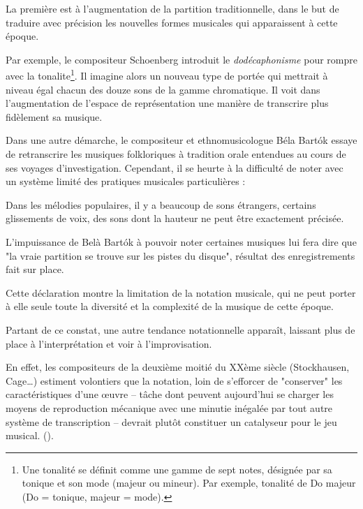 La première est à l'augmentation de la partition traditionnelle, dans le but de traduire avec précision les nouvelles formes musicales qui apparaissent à cette époque.

Par exemple, le compositeur Schoenberg introduit le \textit{dodécaphonisme} pour rompre avec la \gls{tonalite}\footnote{Une tonalité se définit comme une gamme de sept notes, désignée par sa tonique et son mode (majeur ou mineur). Par exemple, tonalité de Do majeur (Do = tonique, majeur = mode).}. Il imagine alors un nouveau type de portée qui mettrait à niveau égal chacun des douze sons de la gamme chromatique. Il voit dans l'augmentation de l'espace de représentation une manière de transcrire plus fidèlement sa musique.

Dans une autre démarche, le compositeur et ethnomusicologue Béla Bart\'{o}k essaye de retranscrire les musiques folkloriques à tradition orale entendues au cours de ses voyages d'investigation.
Cependant, il se heurte à la difficulté de noter avec un système limité des pratiques musicales particulières :

\begin{displayquote}
\og Dans les mélodies populaires, il y a beaucoup de sons étrangers, certains glissements de voix, des sons dont la hauteur ne peut être exactement précisée.\fg 
\end{displayquote}


L'impuissance de Belà Bart\'{o}k à pouvoir noter certaines musiques lui fera dire que "la vraie partition se trouve sur les pistes du disque", résultat des enregistrements fait sur place.

Cette déclaration montre la limitation de la notation musicale, qui ne peut porter à elle seule toute la diversité et la complexité de la musique de cette époque.

Partant de ce constat, une autre tendance notationnelle apparaît, laissant plus de place à l'interprétation et voir à l'improvisation. 

En effet, les compositeurs de la deuxième moitié du XXème siècle (Stockhausen, Cage…) \og estiment volontiers que la notation, loin de s'efforcer de "conserver" les caractéristiques d'une œuvre -- tâche dont peuvent aujourd'hui se charger les moyens de reproduction mécanique avec une minutie inégalée par tout autre système de transcription -- devrait plutôt constituer un catalyseur pour le jeu musical. \fg (\cite[115]{bosseur2005}).

